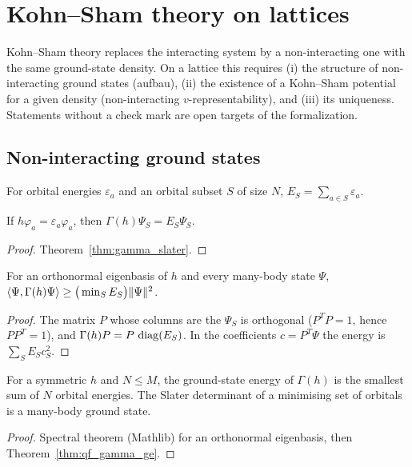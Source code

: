 \chapter{Kohn--Sham theory on lattices}
\label{chap:ks}

Kohn--Sham theory replaces the interacting system by a non-interacting one with the same ground-state
density. On a lattice this requires (i) the structure of non-interacting ground states (aufbau), (ii) the
existence of a Kohn--Sham potential for a given density (non-interacting $v$-representability), and (iii) its
uniqueness. Statements without a check mark are open targets of the formalization.

\section{Non-interacting ground states}

\begin{definition}
  \label{def:orbEnergy}
  \leanok
  For orbital energies $\varepsilon_a$ and an orbital subset $S$ of size $N$, $E_S=\sum_{a\in S}\varepsilon_a$.
\end{definition}

\begin{lemma}
  \label{lem:slaterSub_eigen}
  \leanok
  If $h\varphi_a=\varepsilon_a\varphi_a$, then $\Gamma(h)\Psi_S=E_S\Psi_S$.
\end{lemma}
\begin{proof}
  \leanok
  Theorem~\ref{thm:gamma_slater}.
\end{proof}

\begin{theorem}
  \label{thm:qf_gamma_ge}
  \leanok
  For an orthonormal eigenbasis of $h$ and every many-body state $\Psi$,
  $\langle \Psi, \Gamma(h)\Psi\rangle\ge\big(\min_SE_S\big)\|\Psi\|^2$.
\end{theorem}
\begin{proof}
  \leanok
  The matrix $P$ whose columns are the $\Psi_S$ is orthogonal ($P^TP=1$, hence $PP^T=1$), and
  $\Gamma(h)P=P\,\operatorname{diag}(E_S)$. In the coefficients $c=P^T\Psi$ the energy is $\sum_SE_Sc_S^2$.
\end{proof}

\begin{theorem}[Aufbau]
  \label{thm:aufbau}
  \leanok
  For a symmetric $h$ and $N\le M$, the ground-state energy of $\Gamma(h)$ is the smallest sum of $N$
  orbital energies. The Slater determinant of a minimising set of orbitals is a many-body ground state.
\end{theorem}
\begin{proof}
  \leanok
  Spectral theorem (Mathlib) for an orthonormal eigenbasis, then Theorem~\ref{thm:qf_gamma_ge}.
\end{proof}

